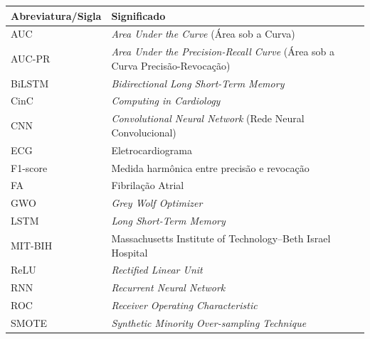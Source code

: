 \documentclass[
    12pt,                %
    openright,           %
    oneside,             %
    a4paper,             %
    english,             %
    brazil               %
]{abntex2}
\begin{document}
\begin{center}
\begin{tabular}{@{}p{3.8cm}p{}@{}}
\toprule
\textbf{Abreviatura/Sigla} & \textbf{Significado} \\
\midrule

AUC & \textit{Area Under the Curve} (Área sob a Curva) \\

AUC-PR & \textit{Area Under the Precision-Recall Curve} (Área sob a Curva Precisão-Revocação) \\

BiLSTM & \textit{Bidirectional Long Short-Term Memory} \\

CinC & \textit{Computing in Cardiology} \\

CNN & \textit{Convolutional Neural Network} (Rede Neural Convolucional) \\

ECG & Eletrocardiograma \\

F1-score & Medida harmônica entre precisão e revocação \\

FA & Fibrilação Atrial \\

GWO & \textit{Grey Wolf Optimizer} \\

LSTM & \textit{Long Short-Term Memory} \\

MIT-BIH & Massachusetts Institute of Technology--Beth Israel Hospital \\

ReLU & \textit{Rectified Linear Unit} \\

RNN & \textit{Recurrent Neural Network} \\

ROC & \textit{Receiver Operating Characteristic} \\

SMOTE & \textit{Synthetic Minority Over-sampling Technique} \\

\bottomrule
\end{tabular}
\end{center}

\cleardoublepage

\tableofcontents*
\cleardoublepage
\end{document}

